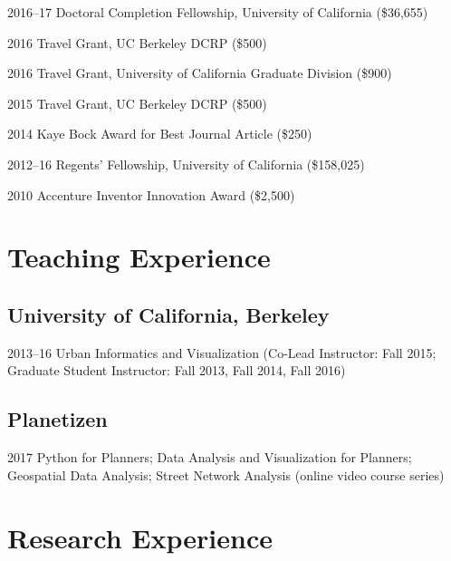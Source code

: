 \documentclass{academiccv}
\begin{document}
\begin{tablist}
	\item[2016--17] \tab Doctoral Completion Fellowship, University of California (\$36,655)
	\item[2016]     \tab Travel Grant, UC Berkeley DCRP (\$500)
	\item[2016]     \tab Travel Grant, University of California Graduate Division (\$900)
	\item[2015]     \tab Travel Grant, UC Berkeley DCRP (\$500)
	\item[2014]     \tab Kaye Bock Award for Best Journal Article (\$250)
	\item[2012--16] \tab Regents' Fellowship, University of California (\$158,025)
	\item[2010]     \tab Accenture Inventor Innovation Award (\$2,500)
\end{tablist}



\section*{Teaching Experience}

\subsection*{University of California, Berkeley}

\begin{tablist}
\item[2013--16]	\tab Urban Informatics and Visualization (Co-Lead Instructor: Fall 2015; Graduate Student Instructor: Fall 2013, Fall 2014, Fall 2016)
\end{tablist}

\subsection*{Planetizen}

\begin{tablist}
\item[2017]		\tab Python for Planners; Data Analysis and Visualization for Planners; Geospatial Data Analysis; Street Network Analysis (online video course series)
\end{tablist}



\section*{Research Experience}
\end{document}
